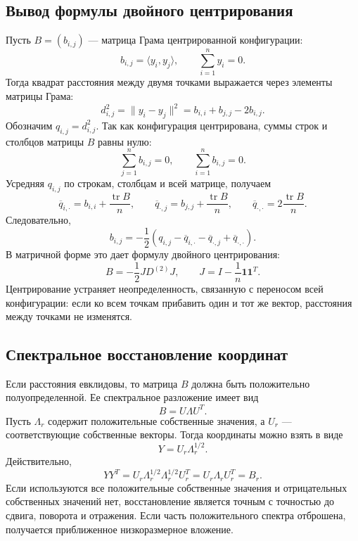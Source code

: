 \documentclass[12pt,a4paper]{article}
\newcommand{\one}{\mathbf{1}}
\begin{document}
\subsection{Вывод формулы двойного центрирования}

Пусть \(B=(b_{i,j})\) --- матрица Грама центрированной конфигурации:
\[
    b_{i,j}=\langle y_i,y_j\rangle,\qquad
    \sum\limits_{i=1}^{n}y_i=0.
\]
Тогда квадрат расстояния между двумя точками выражается через элементы матрицы
Грама:
\[
    d_{i,j}^{2}
    =\|y_i-y_j\|^2
    =b_{i,i}+b_{j,j}-2b_{i,j}.
\]
Обозначим \(q_{i,j}=d_{i,j}^{2}\). Так как конфигурация центрирована, суммы
строк и столбцов матрицы \(B\) равны нулю:
\[
    \sum\limits_{j=1}^{n}b_{i,j}=0,
    \qquad
    \sum\limits_{i=1}^{n}b_{i,j}=0.
\]
Усредняя \(q_{i,j}\) по строкам, столбцам и всей матрице, получаем
\[
    \overline q_{i,\cdot}=b_{i,i}+\frac{\operatorname{tr}B}{n},
    \qquad
    \overline q_{\cdot,j}=b_{j,j}+\frac{\operatorname{tr}B}{n},
    \qquad
    \overline q_{\cdot,\cdot}=2\frac{\operatorname{tr}B}{n}.
\]
Следовательно,
\[
    b_{i,j}
    =
    -\frac{1}{2}
    \left(
        q_{i,j}
        -\overline q_{i,\cdot}
        -\overline q_{\cdot,j}
        +\overline q_{\cdot,\cdot}
    \right).
\]
В матричной форме это дает формулу двойного центрирования:
\[
    B=-\frac{1}{2}JD^{(2)}J,
    \qquad
    J=I-\frac{1}{n}\one\one^{T}.
\]
Центрирование устраняет неопределенность, связанную с переносом всей
конфигурации: если ко всем точкам прибавить один и тот же вектор, расстояния
между точками не изменятся.

\subsection{Спектральное восстановление координат}

Если расстояния евклидовы, то матрица \(B\) должна быть положительно
полуопределенной. Ее спектральное разложение имеет вид
\[
    B=U\Lambda U^{T}.
\]
Пусть \(\Lambda_r\) содержит положительные собственные значения, а \(U_r\) ---
соответствующие собственные векторы. Тогда координаты можно взять в виде
\[
    Y=U_r\Lambda_r^{1/2}.
\]
Действительно,
\[
    YY^{T}
    =
    U_r\Lambda_r^{1/2}\Lambda_r^{1/2}U_r^{T}
    =
    U_r\Lambda_rU_r^{T}
    =
    B_r.
\]
Если используются все положительные собственные значения и отрицательных
собственных значений нет, восстановление является точным с точностью до
сдвига, поворота и отражения. Если часть положительного спектра отброшена,
получается приближенное низкоразмерное вложение.
\end{document}
